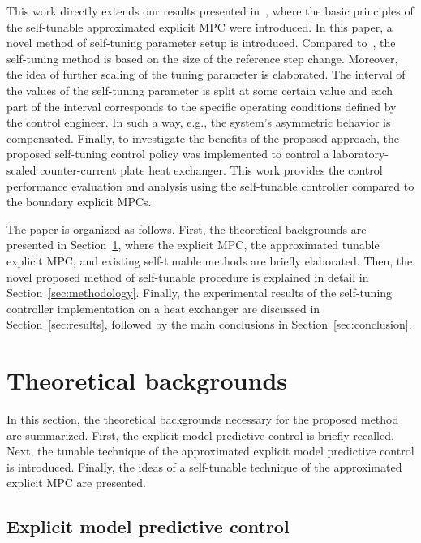 \documentclass[preprint,12pt]{elsarticle}
\begin{document}
	This work directly extends our results presented in~\cite{self_tunable}, where the basic principles of the self-tunable approximated explicit MPC were introduced. In this paper, a novel method of self-tuning parameter setup is introduced. Compared to~\cite{self_tunable}, the self-tuning method is based on the size of the reference step change. Moreover, the idea of further scaling of the tuning parameter is elaborated. The interval of the values of the self-tuning parameter is split at some certain value and each part of the interval corresponds to the specific operating conditions defined by the control engineer. In such a way, e.g., the system's asymmetric behavior is compensated. Finally, to investigate the benefits of the proposed approach, the proposed self-tuning control policy was implemented to control a laboratory-scaled counter-current plate heat exchanger. This work provides the control performance evaluation and analysis using the self-tunable controller compared to the boundary explicit MPCs.
	
	The paper is organized as follows. First, the theoretical backgrounds are presented in Section~\ref{sec:preliminaries}, where the explicit MPC, the approximated tunable explicit MPC, and existing self-tunable methods are briefly elaborated. Then, the novel proposed method of self-tunable procedure is explained in detail in Section~\ref{sec:methodology}. Finally, the experimental results of the self-tuning controller implementation on a heat exchanger are discussed in Section~\ref{sec:results}, followed by the main conclusions in Section~\ref{sec:conclusion}.
	
	\section{Theoretical backgrounds}
	\label{sec:preliminaries}
	
	In this section, the theoretical backgrounds necessary for the proposed method are summarized. First, the explicit model predictive control is briefly recalled. Next, the tunable technique of the approximated explicit model predictive control is introduced. Finally, the ideas of a self-tunable technique of the approximated explicit MPC are presented.
	
	\subsection{Explicit model predictive control}
	\label{sec:eMPC}
	
\end{document}
